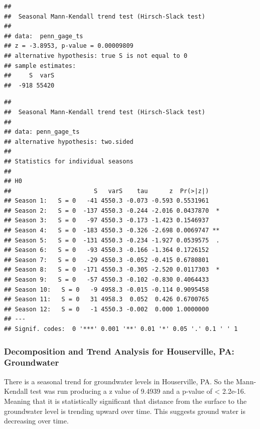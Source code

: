 \documentclass[
  12pt,
]{article}
\begin{document}
\begin{verbatim}
## 
##  Seasonal Mann-Kendall trend test (Hirsch-Slack test)
## 
## data:  penn_gage_ts
## z = -3.8953, p-value = 0.00009809
## alternative hypothesis: true S is not equal to 0
## sample estimates:
##     S  varS 
##  -918 55420
\end{verbatim}

\begin{verbatim}
## 
##  Seasonal Mann-Kendall trend test (Hirsch-Slack test)
## 
## data: penn_gage_ts
## alternative hypothesis: two.sided
## 
## Statistics for individual seasons
## 
## H0
##                       S   varS    tau      z  Pr(>|z|)   
## Season 1:   S = 0   -41 4550.3 -0.073 -0.593 0.5531961   
## Season 2:   S = 0  -137 4550.3 -0.244 -2.016 0.0437870  *
## Season 3:   S = 0   -97 4550.3 -0.173 -1.423 0.1546937   
## Season 4:   S = 0  -183 4550.3 -0.326 -2.698 0.0069747 **
## Season 5:   S = 0  -131 4550.3 -0.234 -1.927 0.0539575  .
## Season 6:   S = 0   -93 4550.3 -0.166 -1.364 0.1726152   
## Season 7:   S = 0   -29 4550.3 -0.052 -0.415 0.6780801   
## Season 8:   S = 0  -171 4550.3 -0.305 -2.520 0.0117303  *
## Season 9:   S = 0   -57 4550.3 -0.102 -0.830 0.4064433   
## Season 10:   S = 0   -9 4958.3 -0.015 -0.114 0.9095458   
## Season 11:   S = 0   31 4958.3  0.052  0.426 0.6700765   
## Season 12:   S = 0   -1 4550.3 -0.002  0.000 1.0000000   
## ---
## Signif. codes:  0 '***' 0.001 '**' 0.01 '*' 0.05 '.' 0.1 ' ' 1
\end{verbatim}

\newpage

\hypertarget{decomposition-and-trend-analysis-for-houserville-pa-groundwater}{%
\subsubsection{Decomposition and Trend Analysis for Houserville, PA:
Groundwater}\label{decomposition-and-trend-analysis-for-houserville-pa-groundwater}}

There is a seasonal trend for groundwater levels in Houserville, PA. So
the Mann-Kendall test was run producing a z value of 9.4939 and a
p-value of \textless{} 2.2e-16. Meaning that it is statistically
significant that distance from the surface to the groundwater level is
trending upward over time. This suggests ground water is decreasing over
time.
\end{document}
